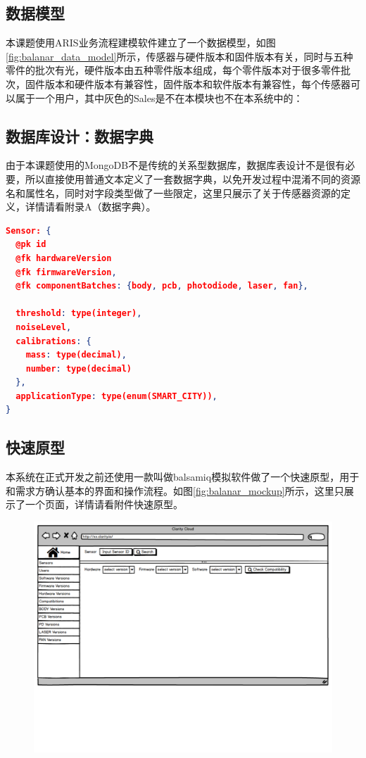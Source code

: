 \subsection{数据模型}
本课题使用ARIS业务流程建模软件建立了一个数据模型，如图\ref{fig:balanar_data_model}所示，传感器与硬件版本和固件版本有关，同时与五种零件的批次有光，硬件版本由五种零件版本组成，每个零件版本对于很多零件批次，固件版本和硬件版本有兼容性，固件版本和软件版本有兼容性，每个传感器可以属于一个用户，其中灰色的Sales是不在本模块也不在本系统中的：
\subsection{数据库设计：数据字典}
由于本课题使用的MongoDB不是传统的关系型数据库，数据库表设计不是很有必要，所以直接使用普通文本定义了一套数据字典，以免开发过程中混淆不同的资源名和属性名，同时对字段类型做了一些限定，这里只展示了关于传感器资源的定义，详情请看附录A（数据字典）。
\begin{lstlisting}[language={JSON}, caption={版本管理模块的数据字典}]
Sensor: {
  @pk id
  @fk hardwareVersion
  @fk firmwareVersion,
  @fk componentBatches: {body, pcb, photodiode, laser, fan},

  threshold: type(integer),
  noiseLevel,
  calibrations: {
    mass: type(decimal),
    number: type(decimal)
  },
  applicationType: type(enum(SMART_CITY)),
}
\end{lstlisting}

\subsection{快速原型}
本系统在正式开发之前还使用一款叫做balsamiq模拟软件做了一个快速原型，用于和需求方确认基本的界面和操作流程。如图\ref{fig:balanar_mockup}所示，这里只展示了一个页面，详情请看附件快速原型。
\begin{figure}[H]
 \centering
 \includegraphics[width=\textwidth,page=8]{pdf/balanar_prototype.pdf}
\end{figure}

